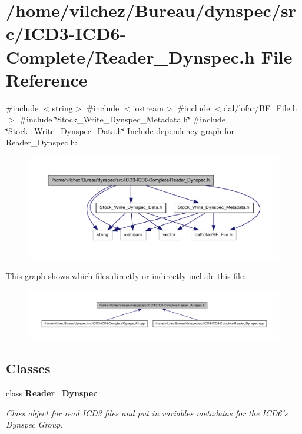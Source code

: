 \section{/home/vilchez/\-Bureau/dynspec/src/\-I\-C\-D3-\/\-I\-C\-D6-\/\-Complete/\-Reader\-\_\-\-Dynspec.h \-File \-Reference}
\label{_reader___dynspec_8h}
{\ttfamily \#include $<$string$>$}\*
{\ttfamily \#include $<$iostream$>$}\*
{\ttfamily \#include $<$dal/lofar/\-B\-F\-\_\-\-File.\-h$>$}\*
{\ttfamily \#include \char`\"{}\-Stock\-\_\-\-Write\-\_\-\-Dynspec\-\_\-\-Metadata.\-h\char`\"{}}\*
{\ttfamily \#include \char`\"{}\-Stock\-\_\-\-Write\-\_\-\-Dynspec\-\_\-\-Data.\-h\char`\"{}}\*
\-Include dependency graph for \-Reader\-\_\-\-Dynspec.\-h\-:\nopagebreak
\begin{figure}[H]
\begin{center}
\leavevmode
\includegraphics[width=350pt]{_reader___dynspec_8h__incl}
\end{center}
\end{figure}
\-This graph shows which files directly or indirectly include this file\-:\nopagebreak
\begin{figure}[H]
\begin{center}
\leavevmode
\includegraphics[width=350pt]{_reader___dynspec_8h__dep__incl}
\end{center}
\end{figure}
\subsection*{\-Classes}
\begin{DoxyCompactItemize}
\item 
class {\bf \-Reader\-\_\-\-Dynspec}
\begin{DoxyCompactList}\small\item\em \-Class object for read \-I\-C\-D3 files and put in variables metadatas for the \-I\-C\-D6's \-Dynspec \-Group. \end{DoxyCompactList}\end{DoxyCompactItemize}
